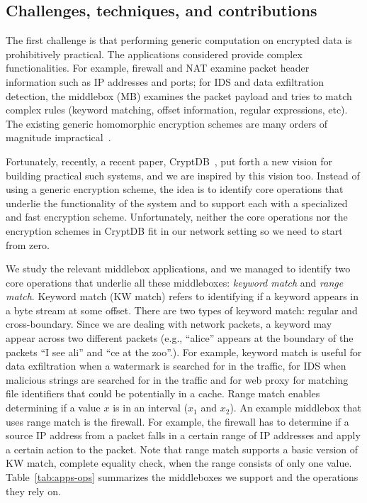    \subsection{Challenges, techniques, and contributions}
    
The first challenge is that performing generic computation on encrypted data is prohibitively practical. The applications considered provide complex functionalities. For example, firewall and NAT examine packet header information such as IP addresses and ports; for IDS and data exfiltration detection, the middlebox (MB) examines the packet payload and tries to match complex rules (keyword matching, offset information,  regular expressions, etc). The existing generic homomorphic encryption schemes are many orders of magnitude impractical~\cite{aesFHE}.

Fortunately, recently, a recent paper, CryptDB~\cite{popa:cryptdb}, put forth a new vision for building practical such systems, and we are inspired by this vision too. Instead of using a generic encryption scheme, the idea is to identify core operations that underlie the functionality of the system and to support each with a specialized and fast encryption scheme. Unfortunately, neither the core operations nor the encryption schemes in CryptDB fit in our network setting so we need to start from zero.

We study the relevant middlebox applications, and we managed to identify two core operations that underlie all these middleboxes: {\em keyword match} and {\em range match}. Keyword match (KW match) refers to  identifying if a keyword appears in a byte stream at some offset. There are two types of keyword match: regular and cross-boundary. Since we are dealing with network packets, a keyword may appear across two different packets (e.g., ``alice'' appears at the boundary of the packets ``I see ali'' and ``ce at the zoo''.). For example, keyword match is useful for data exfiltration when a watermark is searched for in the traffic, for IDS when malicious strings are searched for in the traffic and for web proxy for matching file identifiers that could be potentially in a cache. 
Range match enables determining if a value $x$ is in an interval ($x_1$ and $x_2$). An example middlebox that uses range match is the firewall.   For example, the firewall has to determine if a source IP address from a packet falls in a certain range of IP addresses and apply a certain action to the packet.  Note that range match supports a basic version of KW match, complete equality check, when the range consists of only one value.
%
Table~\ref{tab:apps-ops} summarizes the middleboxes we support and the operations they rely on. 

